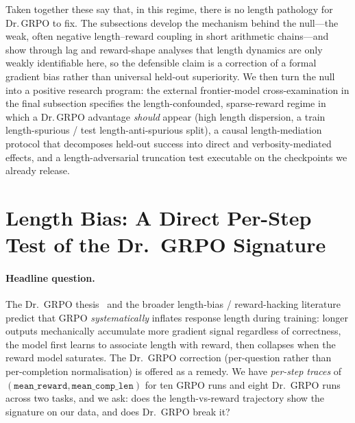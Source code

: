 \documentclass{article}
\begin{document}
Taken together these say that, in this regime, there is no length pathology for
Dr.\,GRPO to fix. The subsections develop the mechanism behind the null---the
weak, often negative length--reward coupling in short arithmetic
chains---and show through lag and reward-shape analyses that length dynamics are
only weakly identifiable here, so the defensible claim is a correction of a formal
gradient bias rather than universal held-out superiority. We then turn the null into
a positive research program: the external frontier-model cross-examination in the
final subsection specifies the length-confounded, sparse-reward regime in which a
Dr.\,GRPO advantage \emph{should} appear (high length dispersion, a train
length-spurious / test length-anti-spurious split), a causal length-mediation
protocol that decomposes held-out success into direct and verbosity-mediated
effects, and a length-adversarial truncation test executable on the checkpoints we
already release.
 \section{Length Bias: A Direct Per-Step Test of the Dr.~GRPO Signature}
\label{sec:length-bias-pillar}

\paragraph{Headline question.}
The Dr.~GRPO thesis~\cite{tong2025drgrpo} and the broader
length-bias / reward-hacking literature~\cite{ouyang2022training, christiano2017deeprlhf}
predict that GRPO
\emph{systematically} inflates response length during training:
longer outputs mechanically accumulate more gradient signal
regardless of correctness, the model first learns to associate length
with reward, then collapses when the reward model saturates. The
Dr.~GRPO correction (per-question rather than per-completion
normalisation) is offered as a remedy. We have
\emph{per-step traces} of $(\texttt{mean\_reward},
\texttt{mean\_comp\_len})$ for ten GRPO runs and eight Dr.~GRPO runs
across two tasks, and we ask: does the length-vs-reward trajectory
show the signature on our data, and does Dr.~GRPO break it?
\end{document}
